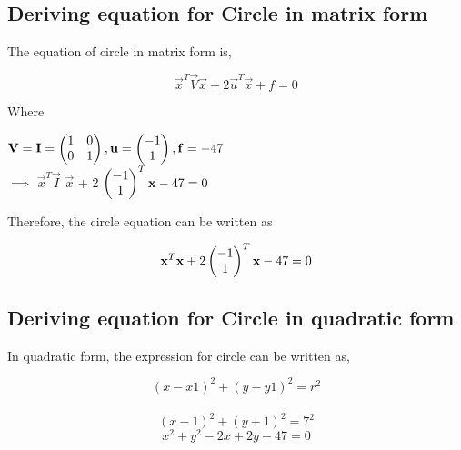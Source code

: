 \documentclass[journal,10pt,twocolumn]{article}
\begin{document}
\subsection{Deriving equation for Circle in matrix form}
\vspace{0.2cm}
\begin{flushleft}
The equation of circle in matrix form is,\\
\vspace{0.25cm}
\end{flushleft}
\vspace{0.25cm}
\begin{equation}
 \vec{x}^T \vec{V} \vec{x} + 2 \vec{u}^T \vec{x} + f = 0
\end{equation}
\begin{flushleft}
Where\\
\end{flushleft}
\center
$\mathbf{V} = \mathbf{I}= \begin{pmatrix} 1 & 0\\ 0 & 1\end{pmatrix} , \mathbf{u} = \begin{pmatrix}-1 \\ 1\end{pmatrix}, \mathbf{f}=-47$\\
\endcenter
\center
  $\implies$  $ \vec{x}^T$$\vec{I}$ $\vec{x}$  + 2 $ \begin{pmatrix}-1\\1\end{pmatrix}^T \mathbf{x} -47 = 0$
\endcenter
\begin{flushleft}
\vspace{0.23cm}
Therefore, the circle equation can be written as
\end{flushleft}
\begin{equation}
    \mathbf{x}^T \mathbf{x} + 2 \begin{pmatrix}-1\\1\end{pmatrix}^T \mathbf{x} -47 = 0
\end{equation}
\endcenter
\begin{flushleft}
\vspace{0.2cm}
\subsection{Deriving equation for Circle in quadratic form}
In quadratic form, the expression for circle  can be written as,
\end{flushleft}
\center
  $$  (x-x1)^2+(y-y1)^2 = r^2 $$\\
    $$(x-1)^2+(y+1)^2 = 7^2$$
\endcenter
\begin{equation}
    x^2+y^2-2x+2y-47=0
\end{equation}
\end{document}
